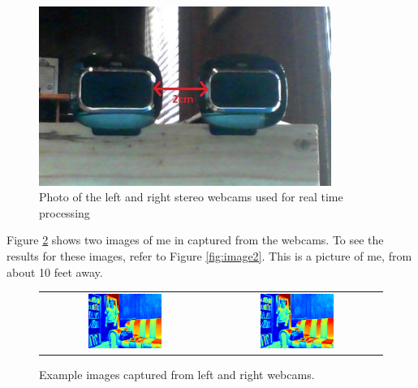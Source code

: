 \documentclass[11pt,fleqn]{article}
\begin{document}
\begin{figure}[!h]
\begin{mdframed}
\centering
\includegraphics[width=0.85\textwidth, trim=30 50 45 50, clip]{images/setup.jpg}
\caption[Photo of the stereo webcams used for real time processing]{Photo of the left and right stereo webcams used for real time processing}
\label{fig:cam}
\end{mdframed}
\end{figure}


Figure \ref{fig:image1} shows two images of me in captured from the webcams. To see the results for these images, refer to Figure \ref{fig:image2}.
This is a picture of me, from about 10 feet away.\\

\begin{figure}[!h]
\begin{mdframed}
\centering
\setlength{}
\begin{tabular}{cc}
\includegraphics[width=0.45\textwidth]{images/l.png} &
\includegraphics[width=0.45\textwidth]{images/r.png} \\[2pt]
\end{tabular}
\caption[Example images captured from webcams]{Example images captured from left and right webcams.}
\label{fig:image1}
\end{mdframed}
\end{figure}
\end{document}

